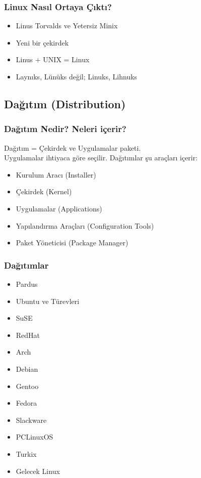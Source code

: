 \documentclass{beamer}
\begin{document}
		\begin{frame}
			\frametitle{Linux Nasıl Ortaya Çıktı?}
				\begin{itemize}
					\item Linus Torvalds ve Yetersiz Minix
					\item Yeni bir çekirdek
					\item Linus + UNIX = Linux
					\item Laynıks, Lünüks değil; Linuks, Lihnuks
				\end{itemize}  



		\end{frame}
	
	\subsection{Dağıtım (Distribution)}
		\begin{frame}
		 	\frametitle{Dağıtım Nedir? Neleri içerir?}
			Dağıtım = Çekirdek ve Uygulamalar paketi.\\ Uygulamalar ihtiyaca göre seçilir. Dağıtımlar şu araçları içerir:\\
			\begin{itemize}[<+->]
			 \item Kurulum Aracı (Installer)
			 \item Çekirdek (Kernel)
			 \item Uygulamalar (Applications)
			 \item Yapılandırma Araçları (Configuration Tools)
			 \item Paket Yöneticisi (Package Manager)
			\end{itemize}

		\end{frame}
		
		\begin{frame}
		 	\frametitle{Dağıtımlar}
			\begin{itemize}
			 \item Pardus
			 \item Ubuntu ve Türevleri
			 \item SuSE
			 \item RedHat
			 \item Arch
			 \item Debian
			 \item Gentoo
			 \item Fedora
			 \item Slackware
			 \item PCLinuxOS
			 \item Turkix
			 \item Gelecek Linux
			\end{itemize}
		\end{frame}
\end{document}

